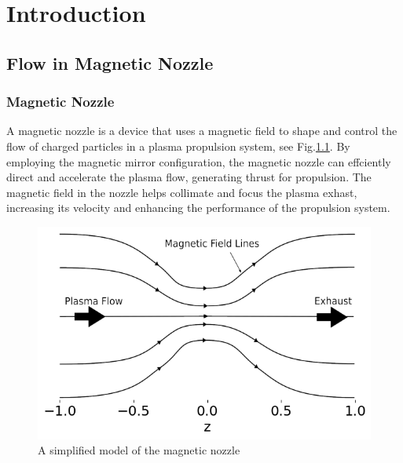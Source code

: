 \chapter{Introduction}
\section{Flow in Magnetic Nozzle}
\subsection{Magnetic Nozzle}
A magnetic nozzle is a device that uses a magnetic field to shape and control the flow of charged particles in a plasma propulsion system, see Fig.\ref{fig:magnetic-nozzle}. By employing the magnetic mirror configuration, the magnetic nozzle can effciently direct and accelerate the plasma flow, generating thrust for propulsion. The magnetic field in the nozzle helps collimate and focus the plasma exhast, increasing its velocity and enhancing the performance of the propulsion system.

\begin{figure}[htbp]
  \centering
  \includegraphics[width=0.7\linewidth]{../../thesis/img/introduction/magnetic-nozzle}
  \caption{A simplified model of the magnetic nozzle}
  \label{fig:magnetic-nozzle}
\end{figure}

